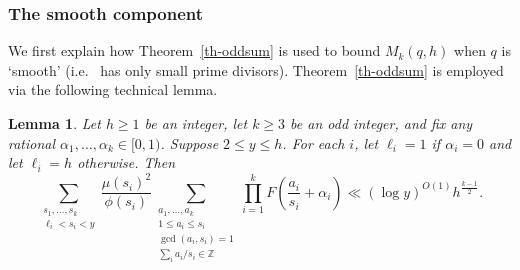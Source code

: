 \documentclass[11pt,letterpaper]{amsart}
\newcommand{\ogcd}[2]{\gcd(#1,#2)}
\newtheorem{lemma}{Lemma}
\theoremstyle{definition}
\begin{document}
\subsubsection{The smooth component} We first explain how Theorem~\ref{th-oddsum} is used to bound $M_k(q,h)$ when $q$ is `smooth' (i.e.~ has only small prime divisors). Theorem~\ref{th-oddsum} is employed via the following technical lemma.
\begin{lemma}\label{lem:bounds-on-s-i-sums-with-alpha-shifts}
Let $h \ge 1$ be an integer, let $k \ge 3$ be an odd integer, and fix any rational $\alpha_1, \dots, \alpha_k \in [0,1)$. Suppose $2\leq y\leq h$. For each $i$, let $\ell_i = 1$ if $\alpha_i = 0$ and let $\ell_i = h$ otherwise. Then
\begin{equation*}
    \sum_{\substack{s_1, \dots, s_k \\ \ell_i < s_i < y}} \frac{\mu(s_i)^2}{\phi(s_i)} \sum_{\substack{a_1, \dots, a_k \\ 1 \le a_i \le s_i \\ \ogcd{a_i}{s_i} = 1 \\ \sum_i a_i/s_i \in \mathbb Z}} \prod_{i=1}^k F\left(\frac{a_i}{s_i} + \alpha_i\right) \ll (\log y)^{O(1)}h^{\tfrac{k-1}{2}}.
\end{equation*}
\end{lemma}
\end{document}

